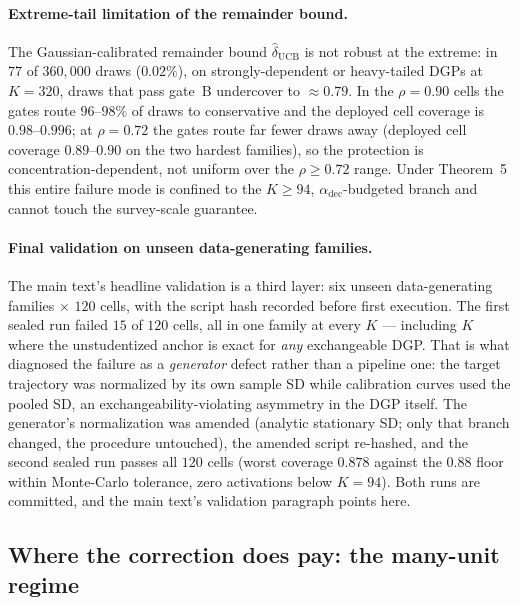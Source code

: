 \documentclass[12pt]{article}
\theoremstyle{definition}
\theoremstyle{remark}
\begin{document}
\paragraph{Extreme-tail limitation of the remainder bound.} The Gaussian-calibrated
remainder bound $\widehat\delta_{\text{UCB}}$ is not robust at the extreme: in $77$ of
$360{,}000$ draws ($0.02\%$), on strongly-dependent or heavy-tailed DGPs at $K{=}320$,
draws that pass gate~B undercover to $\approx0.79$. In the $\rho=0.90$ cells the gates
route $96$--$98\%$ of draws to conservative and the deployed cell coverage is
$0.98$--$0.996$; at $\rho=0.72$ the gates route far fewer draws away (deployed cell
coverage $0.89$--$0.90$ on the two hardest families), so the protection is
concentration-dependent, not uniform over the $\rho\ge0.72$ range. Under
Theorem~5 this entire failure mode is confined to the $K\ge94$,
$\alpha_{\text{dec}}$-budgeted branch and cannot touch the survey-scale guarantee.

\paragraph{Final validation on unseen data-generating families.} The main text's
headline validation is a third layer: six unseen data-generating families
$\times$ $120$ cells, with the script hash recorded before first execution. The first sealed run
failed $15$ of $120$ cells, all in one family at every
$K$ --- including $K$ where the unstudentized anchor is exact for \emph{any}
exchangeable DGP. That is what diagnosed the failure as a \emph{generator}
defect rather than a pipeline one: the target trajectory was normalized by its
own sample SD while calibration curves used the pooled SD, an
exchangeability-violating asymmetry in the DGP itself. The generator's
normalization was amended (analytic stationary SD; only that branch changed,
the procedure untouched), the amended script re-hashed, and the second sealed
run passes all $120$ cells (worst coverage $0.878$ against the $0.88$ floor
within Monte-Carlo tolerance, zero activations below $K=94$). Both runs are
committed, and the main text's validation paragraph
points here.


\subsection{Where the correction does pay: the many-unit regime}
\end{document}
